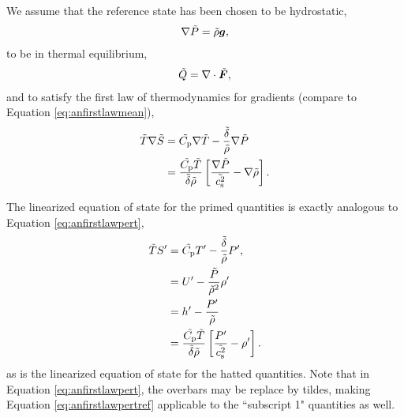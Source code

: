 \documentclass[12pt]{article}
\newcommand{\vecf}{\bm{F}}
\begin{document}
We assume that the reference state has been chosen to be hydrostatic,
\begin{align}\label{eq:refhydro}
	\nabla \tilde{P} = \tilde{\rho}\bm{g},
\end{align}
to be in thermal equilibrium,
\begin{align}\label{eq:refthermalequil}
	\tilde{Q} = \Div\tilde{\vecf},
\end{align}
and to satisfy the first law of thermodynamics for gradients (compare to Equation \eqref{eq:anfirstlawmean}),
\begin{subequations}\label{eq:reffirstlawmean}
	\begin{align}
		\tilde{T}\nabla\tilde{S} &= \tilde{C_{\rm{p}}}\nabla\tilde{T} - \frac{\tilde{\delta} }{\tilde{\rho}}\nabla\tilde{P} \\
		&= \frac{\tilde{C_{\rm{p}}}\tilde{T}}{\tilde{\delta} \tilde{\rho}}\left[\frac{\nabla\tilde{P}}{\tilde{c_{\rm s}^2}}-\nabla\tilde{\rho}\right].
	\end{align}
\end{subequations}

The linearized equation of state for the primed quantities is exactly analogous to Equation \eqref{eq:anfirstlawpert},
\begin{subequations}\label{eq:reffirstlawpert}
	\begin{align}
		\tilde{T} {S^\prime} &= \tilde{C_{\rm{p}}} {T^\prime} - \frac{\tilde{\delta} }{\tilde{\rho}} {P^\prime},\\
  	&= U^\prime - \frac{\tilde{P}}{\tilde{\rho}^2}{\rho^\prime} \label{eq:linuref}\\
&= {h^\prime} - \frac{{P^\prime}}{\tilde{\rho}}\\
		&= \frac{\tilde{C_{\rm{p}}} \tilde{T}}{\tilde{\delta} \tilde{\rho}}\left[\frac{{P^\prime}}{\tilde{c_{\rm s}^2}}-{\rho^\prime}\right].
	\end{align}
\end{subequations}
as is the linearized equation of state for the hatted quantities. Note that in Equation \eqref{eq:anfirstlawpert}, the overbars may be replace by tildes, making Equation \eqref{eq:anfirstlawpertref} applicable to the ``subscript 1" quantities as well. 
\end{document}
